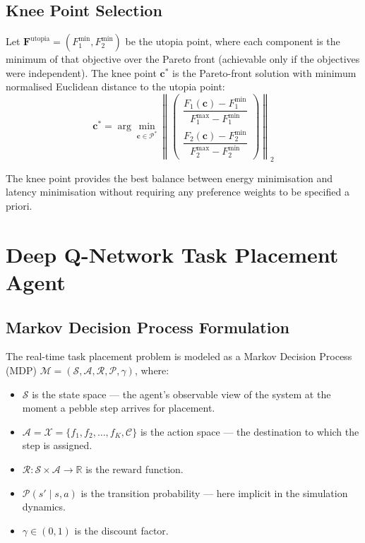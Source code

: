 \documentclass[12pt,a4paper]{article}
\theoremstyle{definition}
\theoremstyle{remark}
\begin{document}
\subsection{Knee Point Selection}

Let $\bm{F}^{\text{utopia}} = (F_1^{\min}, F_2^{\min})$ be the utopia point,
where each component is the minimum of that objective over the Pareto front
(achievable only if the objectives were independent). The knee point
$\mathbf{c}^*$ is the Pareto-front solution with minimum normalised Euclidean
distance to the utopia point:
\begin{equation}
  \mathbf{c}^* = \arg\min_{\mathbf{c} \in \mathcal{P}^*}
  \left\|
  \begin{pmatrix}
    \dfrac{F_1(\mathbf{c}) - F_1^{\min}}{F_1^{\max} - F_1^{\min}} \\[10pt]
    \dfrac{F_2(\mathbf{c}) - F_2^{\min}}{F_2^{\max} - F_2^{\min}}
  \end{pmatrix}
  \right\|_2
  \label{eq:knee}
\end{equation}

The knee point provides the best balance between energy minimisation and
latency minimisation without requiring any preference weights to be specified
a priori.

\section{Deep Q-Network Task Placement Agent}
\label{sec:agent}

\subsection{Markov Decision Process Formulation}

The real-time task placement problem is modeled as a Markov Decision Process
(MDP) $\mathcal{M} = (\mathcal{S}, \mathcal{A}, \mathcal{R}, \mathcal{P},
\gamma)$, where:

\begin{itemize}[leftmargin=2em]
  \item $\mathcal{S}$ is the state space — the agent's observable view of the
    system at the moment a pebble step arrives for placement.
  \item $\mathcal{A} = \mathcal{X} = \{f_1, f_2, \ldots, f_K, \mathcal{C}\}$
    is the action space — the destination to which the step is assigned.
  \item $\mathcal{R}: \mathcal{S} \times \mathcal{A} \to \mathbb{R}$ is the
    reward function.
  \item $\mathcal{P}(s' \mid s, a)$ is the transition probability — here
    implicit in the simulation dynamics.
  \item $\gamma \in (0,1)$ is the discount factor.
\end{itemize}
\end{document}
